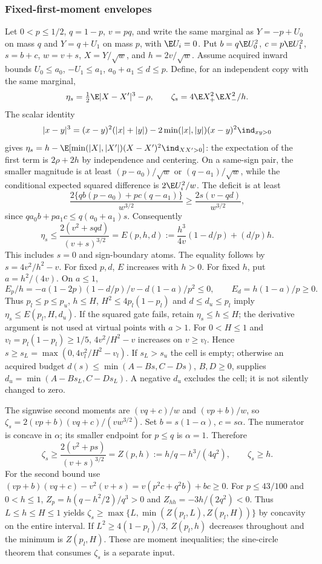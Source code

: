 \subsubsection{Fixed-first-moment envelopes}\label{ms:finite:fixed-h}
Let $0<p\le1/2$, $q=1-p$, $v=pq$, and write the same marginal as
$Y=-p+U_0$ on mass $q$ and $Y=q+U_1$ on mass $p$, with $\E U_i=0$.
Put $b=q\E U_0^2$, $c=p\E U_1^2$, $s=b+c$, $w=v+s$,
$X=Y/\sqrt w$, and $h=2v/\sqrt w$. Assume acquired inward bounds
$U_0\le a_0$, $-U_1\le a_1$, $a_0+a_1\le d\le p$. Define, for
an independent copy with the same marginal,
\[
 \eta_s=\tfrac12\E|X-X'|^3-\rho,\qquad
 \zeta_s=4\E X_+^2\E X_-^2/h.
\]
The scalar identity
\[
 |x-y|^3=(x-y)^2(|x|+|y|)
 -2\min(|x|,|y|)(x-y)^2\ind_{xy>0}
\]
gives $\eta_s=h-\E[\min(|X|,|X'|)(X-X')^2\ind_{XX'>0}]$:
the expectation of the first term is $2\rho+2h$ by independence and
centering. On a same-sign pair, the smaller magnitude is at least
$(p-a_0)/\sqrt w$ or $(q-a_1)/\sqrt w$, while the conditional
expected squared difference is $2\E U_i^2/w$. The deficit is at least
\[
 \frac{2\{qb(p-a_0)+pc(q-a_1)\}}{w^{3/2}}
 \ge\frac{2s(v-qd)}{w^{3/2}},
\]
since $qa_0b+pa_1c\le q(a_0+a_1)s$. Consequently
\begin{equation}\label{ms:finite:eta-fixedh}
 \eta_s\le\frac{2(v^2+sqd)}{(v+s)^{3/2}}
 =E(p,h,d):=\frac{h^3}{4v}(1-d/p)+(d/p)h.
\end{equation}
This includes $s=0$ and sign-boundary atoms. The equality follows by
$s=4v^2/h^2-v$. For fixed $p,d$, $E$ increases with $h>0$. For fixed
$h$, put $a=h^2/(4v)$. On $a\le1$,
\[
 E_p/h=-a(1-2p)(1-d/p)/v-d(1-a)/p^2\le0,
 \qquad E_d=h(1-a)/p\ge0.
\]
Thus $p_l\le p\le p_u$, $h\le H$, $H^2\le4p_l(1-p_l)$ and
$d\le d_u\le p_l$ imply $\eta_s\le E(p_l,H,d_u)$. If the squared
gate fails, retain $\eta_s\le h\le H$; the derivative argument is
not used at virtual points with $a>1$.
For $0<H\le1$ and $v_l=p_l(1-p_l)\ge1/5$, $4v^2/H^2-v$ increases
on $v\ge v_l$. Hence $s\ge s_L=\max(0,4v_l^2/H^2-v_l)$.
If $s_L>s_u$ the cell is empty; otherwise an acquired budget
$d(s)\le\min(A-Bs,C-Ds)$, $B,D\ge0$, supplies
$d_u=\min(A-Bs_L,C-Ds_L)$. A negative $d_u$ excludes the cell;
it is not silently changed to zero.

The signwise second moments are $(vq+c)/w$ and $(vp+b)/w$, so
$\zeta_s=2(vp+b)(vq+c)/(vw^{3/2})$. Set $b=s(1-\alpha)$,
$c=s\alpha$. The numerator is concave in $\alpha$; its smaller
endpoint for $p\le q$ is $\alpha=1$. Therefore
\begin{equation}\label{ms:finite:zeta-fixedh}
 \zeta_s\ge\frac{2(v^2+ps)}{(v+s)^{3/2}}
 =Z(p,h):=h/q-h^3/(4q^2),\qquad \zeta_s\ge h.
\end{equation}
For the second bound use
$(vp+b)(vq+c)-v^2(v+s)=v(p^2c+q^2b)+bc\ge0$.
For $p\le43/100$ and $0<h\le1$, $Z_p=h(q-h^2/2)/q^3>0$ and
$Z_{hh}=-3h/(2q^2)<0$. Thus $L\le h\le H\le1$ yields
$\zeta_s\ge\max\{L,\min(Z(p_l,L),Z(p_l,H))\}$ by concavity on
the entire interval. If $L^2\ge4(1-p_l)/3$, $Z(p_l,h)$ decreases
throughout and the minimum is $Z(p_l,H)$. These are moment inequalities;
the sine-circle theorem that consumes $\zeta_s$ is a separate input.

